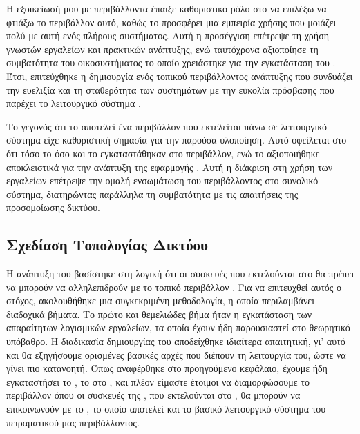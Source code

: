 Η εξοικείωσή μου με περιβάλλοντα  έπαιξε καθοριστικό ρόλο 
στο να επιλέξω να φτιάξω το περιβάλλον αυτό, καθώς το  προσφέρει μια 
εμπειρία χρήσης που μοιάζει πολύ με αυτή ενός πλήρους  
συστήματος. Αυτή η προσέγγιση επέτρεψε τη χρήση γνωστών εργαλείων και 
πρακτικών ανάπτυξης, ενώ ταυτόχρονα αξιοποίησε τη συμβατότητα του  
οικοσυστήματος το οποίο χρειάστηκε για την εγκατάσταση του . Έτσι, επιτεύχθηκε η δημιουργία ενός τοπικού περιβάλλοντος 
ανάπτυξης που συνδυάζει την ευελιξία και τη σταθερότητα των  
συστημάτων με την ευκολία πρόσβασης που παρέχει το λειτουργικό σύστημα .

Το γεγονός ότι το  αποτελεί ένα  περιβάλλον που εκτελείται πάνω σε λειτουργικό σύστημα  είχε καθοριστική σημασία για την παρούσα υλοποίηση. Αυτό οφείλεται στο ότι τόσο το  όσο και το  εγκαταστάθηκαν στο  περιβάλλον, ενώ το  αξιοποιήθηκε αποκλειστικά για την ανάπτυξη της εφαρμογής . Αυτή η διάκριση στη χρήση των εργαλείων επέτρεψε την ομαλή ενσωμάτωση του  περιβάλλοντος στο συνολικό σύστημα, διατηρώντας παράλληλα τη συμβατότητα με τις απαιτήσεις της προσομοίωσης δικτύου.

\subsection{Σχεδίαση Τοπολογίας Δικτύου}

Η ανάπτυξη του  βασίστηκε στη λογική ότι οι συσκευές που εκτελούνται στο  θα πρέπει να μπορούν να αλληλεπιδρούν με το τοπικό περιβάλλον . Για να επιτευχθεί αυτός ο στόχος, ακολουθήθηκε μια συγκεκριμένη μεθοδολογία, η οποία περιλαμβάνει διαδοχικά βήματα.
Το πρώτο και θεμελιώδες βήμα ήταν η εγκατάσταση των απαραίτητων λογισμικών εργαλείων, τα οποία έχουν ήδη παρουσιαστεί στο θεωρητικό υπόβαθρο. Η διαδικασία δημιουργίας του  αποδείχθηκε ιδιαίτερα απαιτητική, γι' αυτό και θα εξηγήσουμε ορισμένες βασικές αρχές που διέπουν τη λειτουργία του, ώστε να γίνει πιο κατανοητή.
Όπως αναφέρθηκε στο προηγούμενο κεφάλαιο, έχουμε ήδη εγκαταστήσει το , το  στο , και πλέον είμαστε έτοιμοι να διαμορφώσουμε το περιβάλλον όπου οι συσκευές της , που εκτελούνται στο , θα μπορούν να επικοινωνούν με το , το οποίο αποτελεί και το βασικό λειτουργικό σύστημα του πειραματικού μας περιβάλλοντος.


